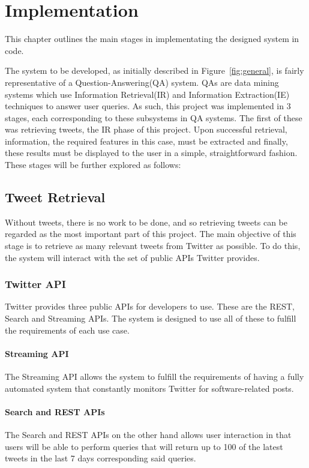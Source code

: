 \chapter{Implementation}
\label{cha:impl}
This chapter outlines the main stages in implementating the designed system in code.


The system to be developed, as initially described in Figure~\ref{fig:general}, is fairly representative of a Question-Answering(QA) system. QAs are data mining systems which use Information Retrieval(IR) and Information Extraction(IE) techniques to answer user queries. As such, this project was implemented in 3 stages, each corresponding to these subsystems in QA systems. The first of these was retrieving tweets, the IR phase of this project. Upon successful retrieval, information, the required features in this case, must be extracted and finally, these results must be displayed to the user in a simple, straightforward fashion. These stages will be further explored as follows:

\section{Tweet Retrieval}
Without tweets, there is no work to be done, and so retrieving tweets can be regarded as the most important part of this project. The main objective of this stage is to retrieve as many relevant tweets from Twitter as possible. To do this, the system will interact with the set of public APIs Twitter provides.

\subsection{Twitter API} %
Twitter provides three public APIs for developers to use. These are the REST, Search and Streaming APIs. The system is designed to use all of these to fulfill the requirements of each use case.

\subsubsection{Streaming API}
The Streaming API allows the system to fulfill the requirements of having a fully automated system that constantly monitors Twitter for software-related posts.

\subsubsection{Search and REST APIs}
The Search and REST APIs on the other hand allows user interaction in that users will be able to perform queries that will return up to 100 of the latest tweets in the last 7 days corresponding said queries.


